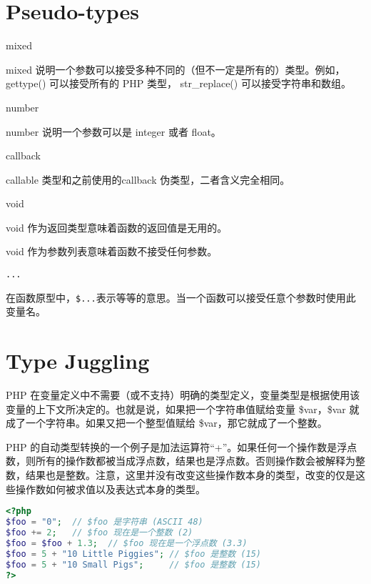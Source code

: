 \section{Pseudo-types}


\begin{compactitem}
\item mixed

mixed 说明一个参数可以接受多种不同的（但不一定是所有的）类型。例如，gettype() 可以接受所有的 PHP 类型， str\_replace() 可以接受字符串和数组。

\item number

number 说明一个参数可以是 integer 或者 float。

\item callback

callable 类型和之前使用的callback 伪类型，二者含义完全相同。

\item void

\begin{compactitem}
\item void 作为返回类型意味着函数的返回值是无用的。
\item void 作为参数列表意味着函数不接受任何参数。
\end{compactitem}

\item \texttt{...}

在函数原型中，\texttt{\$...}表示等等的意思。当一个函数可以接受任意个参数时使用此变量名。

\end{compactitem}



\section{Type Juggling}


PHP 在变量定义中不需要（或不支持）明确的类型定义，变量类型是根据使用该变量的上下文所决定的。也就是说，如果把一个字符串值赋给变量 \$var，\$var 就成了一个字符串。如果又把一个整型值赋给 \$var，那它就成了一个整数。

PHP 的自动类型转换的一个例子是加法运算符“+”。如果任何一个操作数是浮点数，则所有的操作数都被当成浮点数，结果也是浮点数。否则操作数会被解释为整数，结果也是整数。注意，这里并没有改变这些操作数本身的类型，改变的仅是这些操作数如何被求值以及表达式本身的类型。




\begin{lstlisting}[language=PHP]
<?php
$foo = "0";  // $foo 是字符串 (ASCII 48)
$foo += 2;   // $foo 现在是一个整数 (2)
$foo = $foo + 1.3;  // $foo 现在是一个浮点数 (3.3)
$foo = 5 + "10 Little Piggies"; // $foo 是整数 (15)
$foo = 5 + "10 Small Pigs";     // $foo 是整数 (15)
?>
\end{lstlisting}


